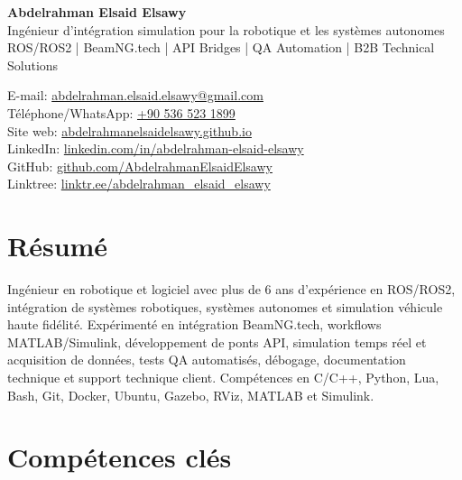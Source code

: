 \documentclass[11pt,a4paper]{article}
\begin{document}
{\LARGE \textbf{Abdelrahman Elsaid Elsawy}}\\
Ingénieur d'intégration simulation pour la robotique et les systèmes autonomes\\
ROS/ROS2 | BeamNG.tech | API Bridges | QA Automation | B2B Technical Solutions

E-mail: \href{mailto:abdelrahman.elsaid.elsawy@gmail.com}{abdelrahman.elsaid.elsawy@gmail.com}\\
Téléphone/WhatsApp: \href{https://wa.me/905365231899}{+90 536 523 1899}\\
Site web: \href{https://abdelrahmanelsaidelsawy.github.io/index.html}{abdelrahmanelsaidelsawy.github.io}\\
LinkedIn: \href{https://www.linkedin.com/in/abdelrahman-elsaid-elsawy}{linkedin.com/in/abdelrahman-elsaid-elsawy}\\
GitHub: \href{https://github.com/AbdelrahmanElsaidElsawy}{github.com/AbdelrahmanElsaidElsawy}\\
Linktree: \href{https://linktr.ee/abdelrahman_elsaid_elsawy}{linktr.ee/abdelrahman\_elsaid\_elsawy}

\section*{Résumé}

Ingénieur en robotique et logiciel avec plus de 6 ans d'expérience en ROS/ROS2, intégration de systèmes robotiques, systèmes autonomes et simulation véhicule haute fidélité. Expérimenté en intégration BeamNG.tech, workflows MATLAB/Simulink, développement de ponts API, simulation temps réel et acquisition de données, tests QA automatisés, débogage, documentation technique et support technique client. Compétences en C/C++, Python, Lua, Bash, Git, Docker, Ubuntu, Gazebo, RViz, MATLAB et Simulink.

\section*{Compétences clés}
\end{document}
